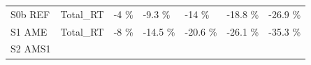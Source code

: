 \documentclass[]{article}
\begin{document}
\begin{longtable}[]{@{}lllllll@{}}
\begin{minipage}[t]{0.14\columnwidth}\raggedright\strut
S0b REF\strut
\end{minipage} & \begin{minipage}[t]{0.13\columnwidth}\raggedright\strut
Total\_RT\strut
\end{minipage} & \begin{minipage}[t]{0.11\columnwidth}\raggedright\strut
-4 \%\strut
\end{minipage} & \begin{minipage}[t]{0.11\columnwidth}\raggedright\strut
-9.3 \%\strut
\end{minipage} & \begin{minipage}[t]{0.11\columnwidth}\raggedright\strut
-14 \%\strut
\end{minipage} & \begin{minipage}[t]{0.11\columnwidth}\raggedright\strut
-18.8 \%\strut
\end{minipage} & \begin{minipage}[t]{0.11\columnwidth}\raggedright\strut
-26.9 \%\strut
\end{minipage}\tabularnewline
\begin{minipage}[t]{0.14\columnwidth}\raggedright\strut
S1 AME\strut
\end{minipage} & \begin{minipage}[t]{0.13\columnwidth}\raggedright\strut
Total\_RT\strut
\end{minipage} & \begin{minipage}[t]{0.11\columnwidth}\raggedright\strut
-8 \%\strut
\end{minipage} & \begin{minipage}[t]{0.11\columnwidth}\raggedright\strut
-14.5 \%\strut
\end{minipage} & \begin{minipage}[t]{0.11\columnwidth}\raggedright\strut
-20.6 \%\strut
\end{minipage} & \begin{minipage}[t]{0.11\columnwidth}\raggedright\strut
-26.1 \%\strut
\end{minipage} & \begin{minipage}[t]{0.11\columnwidth}\raggedright\strut
-35.3 \%\strut
\end{minipage}\tabularnewline
\begin{minipage}[t]{0.14\columnwidth}\raggedright\strut
S2 AMS1\strut
\end{minipage} & \begin{minipage}[t]{0.13\columnwidth}\raggedright\strut

\end{minipage}
\end{longtable}
\end{document}
